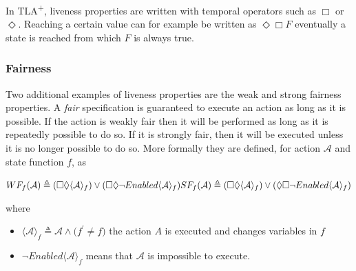 \documentclass[english, biblatex, digitaloutput]{kththesis}
\begin{document}
In TLA\textsuperscript+, liveness properties are written with temporal operators such as $\Box$ or $\Diamond$. Reaching a certain value can for example be written as $\Diamond \Box F$ \ie eventually a state is reached from which $F$ is always true.

\subsubsection{Fairness}

Two additional examples of liveness properties are the weak and strong fairness properties. A \textit{fair} specification is guaranteed to execute an action as long as it is possible. If the action is weakly fair then it will be performed as long as it is repeatedly possible to do so. If it is strongly fair, then it will be executed unless it is no longer possible to do so. More formally they are defined, for action $\mathcal{A}$ and state function $f$, as

\begin{math}
	WF_f\lparen \mathcal{A} \rparen \triangleq \lparen \Box \Diamond \langle \mathcal{A} \rangle_f \rparen \lor  \lparen \Box \Diamond \neg Enabled \langle \mathcal{A} \rangle_f \rparen \\
	SF_f\lparen \mathcal{A} \rparen \triangleq \lparen \Box \Diamond \langle \mathcal{A} \rangle_f \rparen \lor  \lparen \Diamond \Box \neg Enabled \langle \mathcal{A} \rangle_f \rparen
\end{math}

where

\begin{itemize}
	\item $\langle \mathcal{A} \rangle_f \triangleq \mathcal{A} \land \lparen f^\prime \neq f \rparen $ \ie the action $A$ is executed and changes variables in $f$
	\item $\neg Enabled \langle \mathcal{A} \rangle_f$ means that $\mathcal{A}$ is impossible to execute.
\end{itemize}



\end{document}
